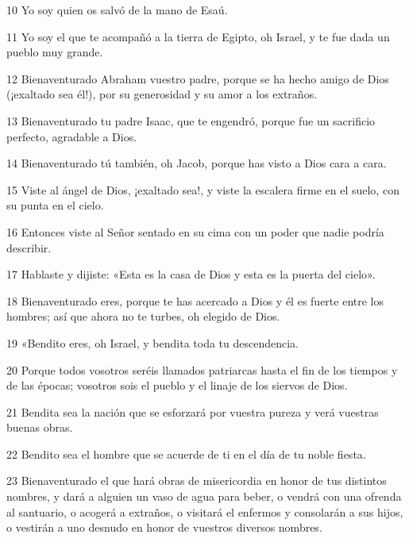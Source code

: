 \par 10 Yo soy quien os salvó de la mano de Esaú.

\par 11 Yo soy el que te acompañó a la tierra de Egipto, oh Israel, y te fue dada un pueblo muy grande.

\par 12 Bienaventurado Abraham vuestro padre, porque se ha hecho amigo de Dios (¡exaltado sea él!), por su generosidad y su amor a los extraños.

\par 13 Bienaventurado tu padre Isaac, que te engendró, porque fue un sacrificio perfecto, agradable a Dios.

\par 14 Bienaventurado tú también, oh Jacob, porque has visto a Dios cara a cara.

\par 15 Viste al ángel de Dios, ¡exaltado sea!, y viste la escalera firme en el suelo, con su punta en el cielo.

\par 16 Entonces viste al Señor sentado en su cima con un poder que nadie podría describir.

\par 17 Hablaste y dijiste: «Esta es la casa de Dios y esta es la puerta del cielo».

\par 18 Bienaventurado eres, porque te has acercado a Dios y él es fuerte entre los hombres; así que ahora no te turbes, oh elegido de Dios.

\par 19 «Bendito eres, oh Israel, y bendita toda tu descendencia.

\par 20 Porque todos vosotros seréis llamados patriarcas hasta el fin de los tiempos y de las épocas; vosotros sois el pueblo y el linaje de los siervos de Dios.

\par 21 Bendita sea la nación que se esforzará por vuestra pureza y verá vuestras buenas obras.

\par 22 Bendito sea el hombre que se acuerde de ti en el día de tu noble fiesta.

\par 23 Bienaventurado el que hará obras de misericordia en honor de tus distintos nombres, y dará a alguien un vaso de agua para beber, o vendrá con una ofrenda al santuario, o acogerá a extraños, o visitará el enfermos y consolarán a sus hijos, o vestirán a uno desnudo en honor de vuestros diversos nombres.

